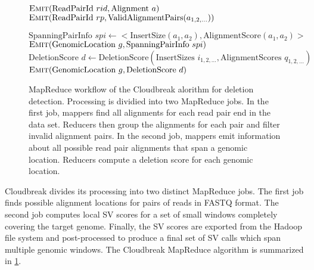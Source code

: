\documentclass[12pt]{article}
\begin{document}
\begin{figure}[p]
\algrenewcommand{}
  \begin{algorithmic}[1]
    \State $\textsc{Emit}(\textrm{ReadPairId }rid, \textrm{Alignment }a)$
    \EndFor
    \EndFunction
    \State $\textsc{Emit}(\textrm{ReadPairId }rp, \textrm{ValidAlignmentPairs}(a_{1,2,\ldots}))$
    \EndFunction
    \EndProcedure

    \State $ \textrm{SpanningPairInfo }spi \gets <\textrm{InsertSize}(a_1,a_2), \textrm{AlignmentScore}(a_1,a_2)>$
    \State $\textsc{Emit}(\textrm{GenomicLocation }g, \textrm{SpanningPairInfo }spi)$
    \EndFor
    \EndFor
    \EndFunction
    \State $\textrm{DeletionScore } d \gets \textrm{DeletionScore}(\textrm{InsertSizes }i_{1,2,\ldots}, \textrm{AlignmentScores }q_{1,2,\ldots})$
    \State $\textsc{Emit}(\textrm{GenomicLocation }g, \textrm{DeletionScore } d)$
    \EndFunction
    \EndProcedure
  \end{algorithmic}
  \caption{MapReduce workflow of the Cloudbreak alorithm for deletion detection. Processing is dividied into two MapReduce jobs. In the first job, mappers find all alignments for each read pair end in the data set. Reducers then group the alignments for each pair and filter invalid alignment pairs. In the second job, mappers emit information about all possible read pair alignments that span a genomic location. Reducers compute a deletion score for each genomic location.}
\label{algo1}
\end{figure}

Cloudbreak divides its processing into two distinct MapReduce jobs. The first job finds possible alignment locations for pairs of reads in FASTQ format. The second job computes local SV scores for a set of small windows completely covering the target genome. Finally, the SV scores are exported from the Hadoop file system and post-processed to produce a final set of SV calls which span multiple genomic windows. The Cloudbreak MapReduce algorithm is summarized in \ref{algo1}.
\end{document}
